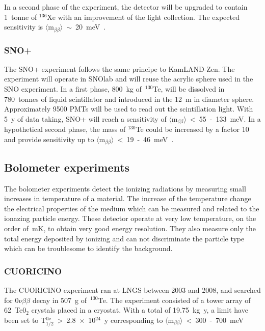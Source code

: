 \documentclass[main.tex]{subfiles}
\begin{document}
\NI In a second phase of the experiment, the detector will be upgraded to contain 1~tonne of $^{\text{136}}$Xe with an improvement of the light collection. The expected sensitivity is $\langle \text{m}_{\beta\beta} \rangle$~$\sim$~20~meV~\cite{KamLAND-Zen3}.


\FloatBarrier


\subsubsection{SNO+}


\NI The SNO+ experiment follows the same principe to KamLAND-Zen. The experiment will operate in SNOlab and will reuse the acrylic sphere used in the SNO experiment. In a first phase, 800~kg of~$^{\text{130}}$Te, will be dissolved in 780~tonnes of liquid scintillator and introduced in the 12~m in diameter sphere. Approximately 9500 PMTs will be used to read out the scintillation light. With 5~y of data taking, SNO+ will reach a sensitivity of $\langle \text{m}_{\beta\beta} \rangle$~<~55~-~133~meV. In a hypothetical second phase, the mass of $^{\text{130}}$Te could be increased by a factor 10 and provide sensitivity up to  $\langle \text{m}_{\beta\beta} \rangle$~<~19~-~46~meV~\cite{SNO+}.


\subsection{Bolometer experiments}


\NI The bolometer experiments detect the ionizing radiations by measuring small increases in temperature of a material. The increase of the temperature change the electrical properties of the medium which can be measured and related to the ionazing particle energy. These detector operate at very low temperature, on the order of~mK, to obtain very good energy resolution. They also measure only the total energy deposited by ionizing and can not discriminate the particle type which can be troublesome to identify the background. 


\subsubsection{CUORICINO}


\NI The CUORICINO experiment ran at LNGS between 2003 and 2008, and searched for 0$\nu\beta\beta$ decay in 507~g of~$^{\text{130}}$Te. The experiment consisted of a tower array of 62~Te0$_\text{2}$ crystals placed in a cryostat. With a total of 19.75~kg~y, a limit have been set to T$_{\text{1/2}}^{0\nu}$~>~2.8~$\times$~10$^{\text{24}}$~y corresponding to $\langle \text{m}_{\beta\beta} \rangle$~<~300~-~700~meV~\cite{CUORICINO}
\end{document}
